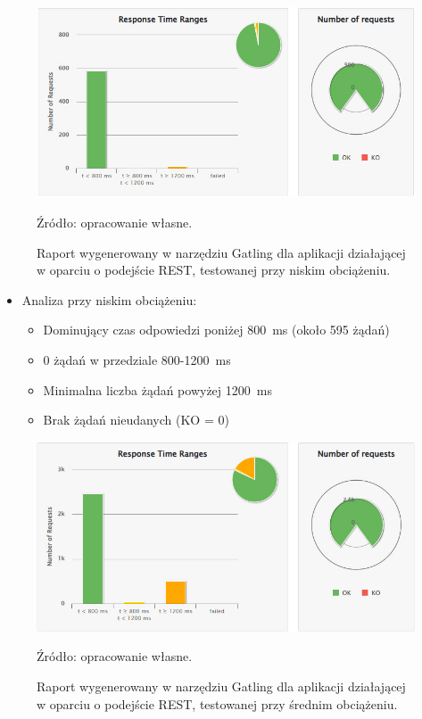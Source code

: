 \documentclass[runningheads,12pt]{llncs}
\begin{document}
\begin{figure}
    \includegraphics[width=\linewidth]{images/rest-gatling-low-graph.jpg}
    \caption{Raport wygenerowany w narzędziu Gatling dla aplikacji działającej w oparciu o podejście REST, testowanej przy niskim obciążeniu.} \label{fig1}
    \vspace{0.5em}
    {\small Źródło: opracowanie własne.}
\end{figure}

\begin{itemize}
  \item Analiza przy niskim obciążeniu:
  \begin{itemize}
    \item Dominujący czas odpowiedzi poniżej 800~ms (około 595 żądań)
    \item 0 żądań w przedziale 800-1200~ms
    \item Minimalna liczba żądań powyżej 1200~ms
    \item Brak żądań nieudanych (KO = 0)
  \end{itemize}
\end{itemize}

\newpage

\begin{figure}
    \includegraphics[width=\linewidth]{images/rest-gatling-middle-rest.jpg}
    \caption{Raport wygenerowany w narzędziu Gatling dla aplikacji działającej w oparciu o podejście REST, testowanej przy średnim obciążeniu.} \label{fig2}
    \vspace{0.5em}
    {\small Źródło: opracowanie własne.}
\end{figure}
\end{document}
